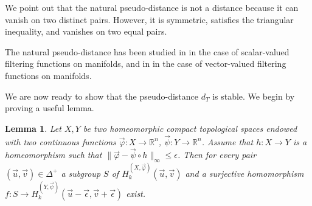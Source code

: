 \documentclass{amsart}
\newtheorem{lemma}[theorem]{Lemma}
\theoremstyle{definition}
\theoremstyle{remark}
\newcommand{\R}{\mathbb{R}}
\numberwithin{equation}{section}
\begin{document}
We point out that the natural pseudo-distance is not a distance
because it can vanish on two distinct pairs. However, it is
symmetric, satisfies the triangular inequality, and vanishes on
two equal pairs.

The natural pseudo-distance has been studied in
\cite{DoFr04,DoFr07,DoFr09} in the case of scalar-valued filtering
functions on manifolds, and in \cite{FrMu99} in the case of
vector-valued filtering functions on manifolds.


We are now ready to show that the pseudo-distance $d_T$ is stable.
We begin by proving a useful lemma.

\begin{lemma}\label{lemmahom}
Let $X,Y$ be two homeomorphic compact topological spaces  endowed with
two continuous functions $\vec \varphi: X \to \R^n$, $\vec \psi: Y
\to \R^n$.
Assume that $h:X\to Y$ is a homeomorphism such that $\|\vec\varphi-\vec\psi\circ h\|_\infty\le \epsilon$. Then for every pair $(\vec u,\vec v)\in \Delta^+$ a subgroup $S$ of $H^{(X,\vec\varphi)}_k(\vec u,\vec v)$ and a surjective homomorphism $f:S\to  H^{(Y,\vec\psi)}_k(\vec u-\vec \epsilon,\vec v+\vec \epsilon)$ exist.
\end{lemma}
\end{document}
